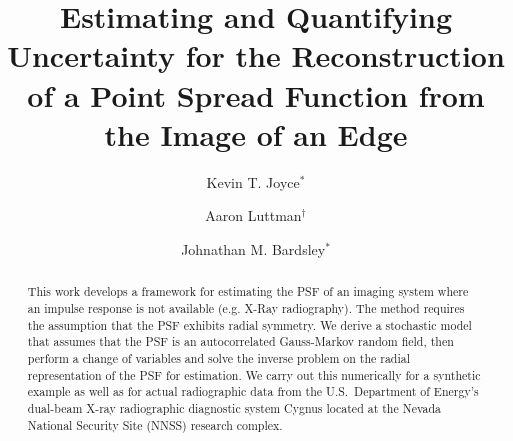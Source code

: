 \documentclass{amsart}
\title{Estimating and Quantifying Uncertainty for the Reconstruction of a Point Spread Function from the Image of an Edge}
\author{Kevin T. Joyce$^*$} \label{A1}
\author{Aaron Luttman$^\dagger$} \label{A2}
\author{Johnathan M. Bardsley$^*$}  \label{A3}
\theoremstyle{plain}
\begin{document}
 
\renewcommand{\bar}{\overline}
\renewcommand{\hat}{\widehat}
\renewcommand{\tilde}{\widetilde}
\newcommand{\eps}{\varepsilon}
\newcommand{\del}{\partial}
\newcommand{\RR}{\ensuremath{\mathbb R}}
\newcommand{\vect}[1]{\boldsymbol{#1}}
\newcommand{\DD}{\ensuremath{\mathfrak D}}
\newcommand{\K}{\ensuremath{\mathscr K}}
\newcommand{\R}{\ensuremath{\mathscr R}}
\newcommand{\HH}{\ensuremath{\mathscr H}}

\nocite{bachman1966,rudin1991,tikhonov1963,hansen1994,morozov1993,bracewell,abramowitz1972,morton2005numerical} %

\begin{abstract}
  This work develops a framework for estimating the PSF of an imaging system where an impulse response is not available (e.g. X-Ray radiography).
  The method requires the assumption that the PSF exhibits radial symmetry.
  We derive a stochastic model that assumes that the PSF is an autocorrelated Gauss-Markov random field, then perform a change of variables and solve the inverse problem on the radial representation of the PSF for estimation.
  We carry out this numerically for a synthetic example as well as for actual radiographic data from the U.S.~Department of Energy's dual-beam X-ray radiographic diagnostic system Cygnus
  located at the Nevada National Security Site (NNSS) research complex.
\end{abstract}

\maketitle

\end{document}
